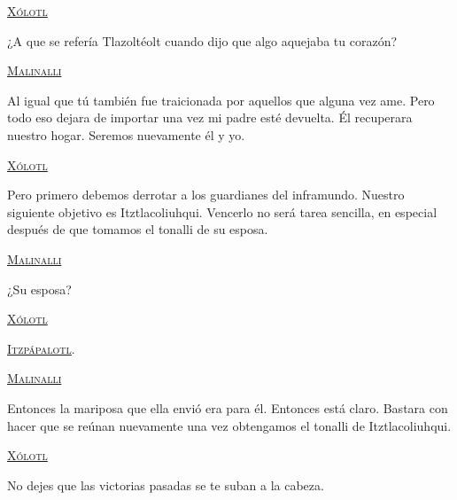 \documentclass[11pt,letterpaper]{article}
\begin{document}
\begin{center}
\textsc{\underline{Xólotl}}
\\
\par
¿A que se refería Tlazoltéolt cuando dijo que algo aquejaba tu corazón?
\\
\par
\textsc{\underline{Malinalli}}
\\
\par
Al igual que tú también fue traicionada por aquellos que alguna vez ame. Pero todo eso dejara de importar una vez mi padre esté devuelta. Él recuperara nuestro hogar. Seremos nuevamente él y yo.
\\
\par
\textsc{\underline{Xólotl}}
\\
\par
Pero primero debemos derrotar a los guardianes del inframundo. Nuestro siguiente objetivo es Itztlacoliuhqui. Vencerlo no será tarea sencilla, en especial después de que tomamos el tonalli de su esposa.
\\
\par
\textsc{\underline{Malinalli}}
\\
\par
¿Su esposa?
\\
\par
\textsc{\underline{Xólotl}}
\\
\par
\textsc{\underline{Itzpápalotl}}.
\\
\par
\textsc{\underline{Malinalli}}
\\
\par
Entonces la mariposa que ella envió era para él. Entonces está claro. Bastara con hacer que se reúnan nuevamente una vez obtengamos el tonalli de Itztlacoliuhqui.
\\
\par
\textsc{\underline{Xólotl}}
\\
\par
No dejes que las victorias pasadas se te suban a la cabeza.
\end{center}
\end{document}
